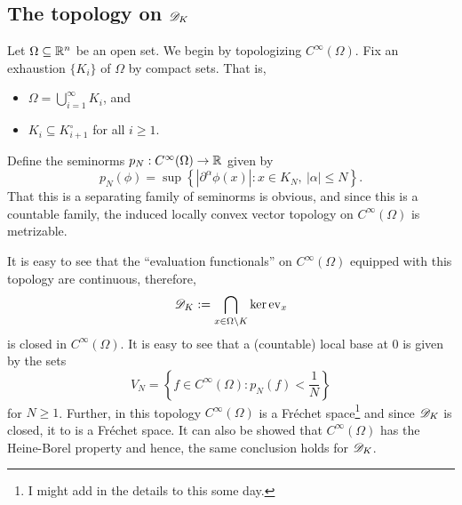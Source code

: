 \subsection{The topology on \texorpdfstring{$\mathscr{D}_K$}{DK}}

Let $\Omega\subseteq\mathbb{R}^n$ be an open set. We begin by topologizing $C^\infty(\Omega)$. Fix an exhaustion $\{K_i\}$ of $\Omega$ by compact sets. That is,
\begin{itemize}
    \item $\displaystyle\Omega = \bigcup_{i = 1}^\infty K_i$, and 
    \item $K_i\subseteq K_{i + 1}^\circ$ for all $i\ge 1$.
\end{itemize}

Define the seminorms $p_N: C^\infty(\Omega)\to\mathbb{R}$ given by 
\begin{equation*}
    p_N(\phi) = \sup\left\{|\partial^\alpha\phi(x)|\colon x\in K_N,~|\alpha|\le N\right\}.
\end{equation*}
That this is a separating family of seminorms is obvious, and since this is a countable family, the induced locally convex vector topology on $C^\infty(\Omega)$ is metrizable.

It is easy to see that the ``evaluation functionals'' on $C^\infty(\Omega)$ equipped with this topology are continuous, therefore, 
\begin{equation*}
    \mathscr{D}_K := \bigcap_{x\in\Omega\setminus K} \ker\operatorname{ev}_x
\end{equation*}
is closed in $C^\infty(\Omega)$. It is easy to see that a (countable) local base at $0$ is given by the sets 
\begin{equation*}
    V_N = \left\{f\in C^\infty(\Omega)\colon p_N(f) < \frac{1}{N}\right\}
\end{equation*}
for $N\ge 1$. Further, in this topology $C^\infty(\Omega)$ is a Fr\'echet space\footnote{I might add in the details to this some day.} and since $\mathscr{D}_K$ is closed, it to is a Fr\'echet space. It can also be showed that $C^\infty(\Omega)$ has the Heine-Borel property and hence, the same conclusion holds for $\mathscr{D}_K$.


